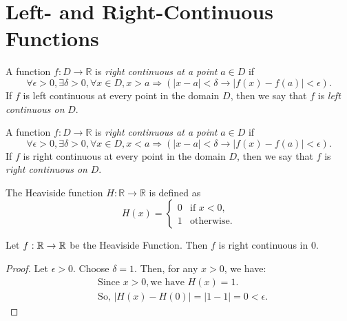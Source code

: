 \section{Left- and Right-Continuous Functions}

\begin{definition}\label{def:leftcontinuous}
    A function $f : D \to \mathbb{R}$ is \textit{right continuous at a point} $a \in D$ if 
    \[
        \forall \epsilon > 0, \exists \delta > 0, \forall x \in D, x > a \Rightarrow (|x - a| < \delta \rightarrow |f(x) - f(a)| < \epsilon).
    \]
    If $f$ is left continuous at every point in the domain $D$, then we say that $f$ is \textit{left continuous on} $D$.
\end{definition}

\begin{definition}\label{def:rightcontinuous}
    A function $f : D \to \mathbb{R}$ is \textit{right continuous at a point} $a \in D$ if 
    \[
        \forall \epsilon > 0, \exists \delta > 0, \forall x \in D, x < a \Rightarrow (|x - a| < \delta \rightarrow |f(x) - f(a)| < \epsilon).
    \]
    If $f$ is right continuous at every point in the domain $D$, then we say that $f$ is \textit{right continuous on} $D$.
\end{definition}

\begin{definition}\label{def:heaviside}
    The Heaviside function $H : \mathbb{R} \to \mathbb{R}$ is defined as
    \[
    H(x) = \begin{cases} 
        0 & \text{if } x < 0, \\
        1 & \text{otherwise}.
    \end{cases}
    \]
\end{definition}

\begin{theorem}
    Let $f: \mathbb{R} \to \mathbb{R}$ be the Heaviside Function. Then $f$ is right continuous in $0$.
\end{theorem}

\begin{proof}
    Let $\epsilon > 0$. Choose $\delta = 1$. Then, for any $x > 0$, we have:
    \begin{align*}
        &\text{Since } x > 0, \text{we have } H(x) = 1. \\
        &\text{So, } |H(x) - H(0)| = |1 - 1| = 0 < \epsilon.
    \end{align*}
\end{proof}

